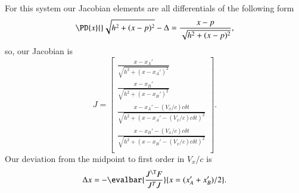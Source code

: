 For this system our Jacobian elements are all differentials of the following form
\begin{equation}\label{eqn:relativisticElectrodynamicsA1:370}
\PD{x}{} \sqrt{ h^2 + (x - p)^2 } - \Delta = \frac{x-p}{\sqrt{h^2 + (x-p)^2}},
\end{equation}
so, our Jacobian is
\begin{equation}\label{eqn:relativisticElectrodynamicsA1:380}
J =
\begin{bmatrix}
\frac{x - x_A'}{\sqrt{ h^2 + (x - x_A')^2 } } \\
\frac{x - x_B'}{\sqrt{ h^2 + (x - x_B')^2 } } \\
\frac{x - x_A' - (V_x/c) c \delta t}{\sqrt{ h^2 + (x - x_A' - (V_x/c) c \delta t)^2 } } \\
\frac{x - x_B' - (V_x/c) c \delta t}{\sqrt{ h^2 + (x - x_B' - (V_x/c) c \delta t)^2 } } \\
\end{bmatrix}.
\end{equation}
Our deviation from the midpoint to first order in \(V_x/c\) is
\begin{equation}\label{eqn:relativisticElectrodynamicsA1:390}
\Delta x = - \evalbar{ \frac{J^\T F}{J^T J} }{x = (x_A' + x_B')/2}.
\end{equation}

